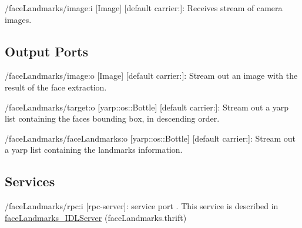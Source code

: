 \begin{DoxyItemize}
\item /face\+Landmarks/image\+:i \mbox{[}Image\mbox{]} \mbox{[}default carrier\+:\mbox{]}\+: Receives stream of camera images.
\end{DoxyItemize}\hypertarget{group__yarpOpenPose_outputports_sec}{}\subsection{Output Ports}\label{group__yarpOpenPose_outputports_sec}

\begin{DoxyItemize}
\item /face\+Landmarks/image\+:o \mbox{[}Image\mbox{]} \mbox{[}default carrier\+:\mbox{]}\+: Stream out an image with the result of the face extraction.
\item /face\+Landmarks/target\+:o \mbox{[}yarp\+::os\+::\+Bottle\mbox{]} \mbox{[}default carrier\+:\mbox{]}\+: Stream out a yarp list containing the faces bounding box, in descending order.
\item /face\+Landmarks/face\+Landmarks\+:o \mbox{[}yarp\+::os\+::\+Bottle\mbox{]} \mbox{[}default carrier\+:\mbox{]}\+: Stream out a yarp list containing the landmarks information.
\end{DoxyItemize}\hypertarget{group__yarpOpenPose_services_sec}{}\subsection{Services}\label{group__yarpOpenPose_services_sec}

\begin{DoxyItemize}
\item /face\+Landmarks/rpc\+:i \mbox{[}rpc-\/server\mbox{]}\+: service port . This service is described in \mbox{\hyperlink{classfaceLandmarks__IDLServer}{face\+Landmarks\+\_\+\+I\+D\+L\+Server}} (face\+Landmarks.\+thrift) 
\end{DoxyItemize}